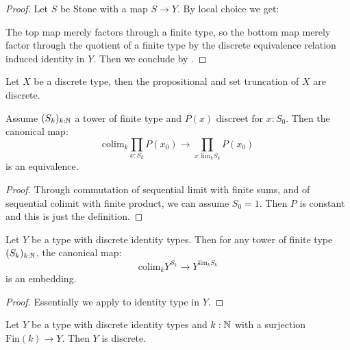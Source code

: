 \begin{proof}
Let $S$ be Stone with a map $S\to Y$. By local choice we get:
 \begin{center}
\end{center}
The top map merely factors through a finite type, so the bottom map merely factor through the quotient of a finite type by the discrete equivalence relation induced identity in $Y$. Then we conclude by .
\end{proof}

\begin{corollary}\label{prop-set-truncation-discrete}
Let $X$ be a discrete type, then the propositional and set truncation of $X$ are discrete.
\end{corollary}

\begin{lemma}\label{discrete-continuity-dependent}
Assume $(S_k)_{k:\mathbb{N}}$ a tower of finite type and $P(x)$ discreet for $x:S_0$. Then the canonical map:
\[\mathrm{colim}_k\prod_{x:S_k}P(x_0) \to \prod_{x:\mathrm{lim}_kS_k}P(x_0)\]
is an equivalence.
\end{lemma}

\begin{proof}
Through commutation of sequential limit with finite sums, and of sequential colimit with finite product, we can assume $S_0 = 1$. Then $P$ is constant and this is just the definition.
\end{proof}

\begin{lemma}\label{discrete-identity-embedding}
Let $Y$ be a type with discrete identity types. Then for any tower of finite type $(S_k)_{k:\mathbb{N}}$, the canonical map:
\[\mathrm{colim}_kY^{S_k} \to Y^{\mathrm{lim}_kS_k}\]
is an embedding.
\end{lemma}

\begin{proof}
Essentially we apply  to identity type in $Y$. 
\end{proof}

\begin{lemma}\label{higher-quotient-finite-discrete-discrete}
Let $Y$ be a type with discrete identity types and $k:\mathbb{N}$ with a surjection $\mathrm{Fin}(k)\to Y$. Then $Y$ is discrete.
\end{lemma}


